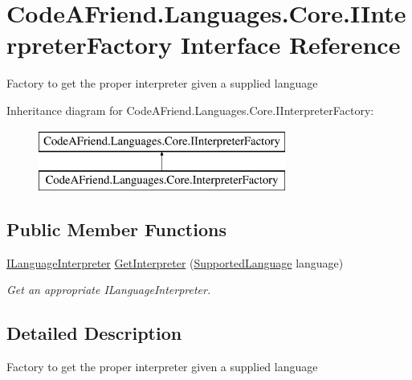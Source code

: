 \hypertarget{interface_code_a_friend_1_1_languages_1_1_core_1_1_i_interpreter_factory}{}\section{Code\+A\+Friend.\+Languages.\+Core.\+I\+Interpreter\+Factory Interface Reference}
\label{interface_code_a_friend_1_1_languages_1_1_core_1_1_i_interpreter_factory}


Factory to get the proper interpreter given a supplied language  


Inheritance diagram for Code\+A\+Friend.\+Languages.\+Core.\+I\+Interpreter\+Factory\+:\begin{figure}[H]
\begin{center}
\leavevmode
\includegraphics[height=2.000000cm]{interface_code_a_friend_1_1_languages_1_1_core_1_1_i_interpreter_factory}
\end{center}
\end{figure}
\subsection*{Public Member Functions}
\begin{DoxyCompactItemize}
\item 
\mbox{\hyperlink{interface_code_a_friend_1_1_data_model_1_1_i_language_interpreter}{I\+Language\+Interpreter}} \mbox{\hyperlink{interface_code_a_friend_1_1_languages_1_1_core_1_1_i_interpreter_factory_a4d2f3ae695515fc3c28f352a20bfd601}{Get\+Interpreter}} (\mbox{\hyperlink{namespace_code_a_friend_1_1_data_model_a13e088c525db1b03a4de75420ced79b2}{Supported\+Language}} language)
\begin{DoxyCompactList}\small\item\em Get an appropriate I\+Language\+Interpreter. \end{DoxyCompactList}\end{DoxyCompactItemize}


\subsection{Detailed Description}
Factory to get the proper interpreter given a supplied language 



